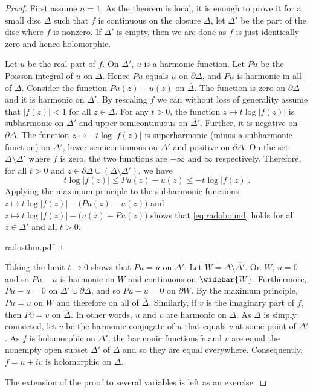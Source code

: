 \documentclass[12pt,openany]{book}
\newcommand{\abs}[1]{\left\lvert {#1} \right\rvert}
\theoremstyle{plain}
\theoremstyle{remark}
\theoremstyle{definition}
\newenvironment{myfig}{%
    \begin{center}
}{%
    \end{center}
}
\theoremstyle{exercise}
\theoremstyle{example}
\begin{document}
\begin{proof}
First assume $n=1$.  As the theorem is local, it is
enough to prove it for a small disc $\Delta$ such that $f$ is continuous
on the closure $\overline{\Delta}$, let $\Delta'$ be the part of the disc
where $f$ is nonzero.  If $\Delta'$ is empty, then we are done as
$f$ is just identically zero and hence holomorphic.

Let $u$ be the real part of $f$.  On $\Delta'$, $u$ is a harmonic function.
Let $Pu$ be the Poisson integral of $u$ on $\Delta$.  Hence $Pu$
equals $u$ on $\partial \Delta$, and $Pu$ is harmonic in all of $\Delta$.
Consider the function
$Pu(z) - u(z)$ on $\overline{\Delta}$.  The function is zero
on $\partial \Delta$ and it is harmonic on $\Delta'$.  By rescaling $f$
we can without loss of generality assume that $\abs{f(z)} < 1$ for all $z
\in \overline{\Delta}$.  For any $t >0$, the function 
$z \mapsto t \log \abs{f(z)}$ is subharmonic on $\Delta'$ and
upper-semicontinuous on $\overline{\Delta'}$.  Further, it is negative
on $\partial \Delta$.  The function $z \mapsto -t \log \abs{f(z)}$ is
superharmonic (minus a subharmonic function) on $\Delta'$,
lower-semicontinuous on $\overline{\Delta'}$ and positive on $\partial
\Delta$.  On the set $\Delta \setminus \Delta'$ where $f$ is zero, the two functions are $-\infty$ and
$\infty$ respectively.  Therefore, for all $t > 0$ and 
$z \in \partial \Delta \cup (\Delta \setminus \Delta')$,
we have
\begin{equation} \label{eq:radobound}
t \log \abs{f(z)} \leq Pu(z)-u(z) \leq -t \log \abs{f(z)}  .
\end{equation}
Applying the maximum principle to the subharmonic functions
$z \mapsto t \log \abs{f(z)} - \bigl(Pu(z)-u(z)\bigr)$
and
$z \mapsto t \log \abs{f(z)} - \bigl(u(z)-Pu(z)\bigr)$
shows that 
\eqref{eq:radobound} holds for all $z \in \Delta'$ and all $t > 0$.

\begin{myfig}
{radosthm.pdf_t}
\end{myfig}


Taking the limit
$t \to 0$ shows that $Pu = u$ on $\Delta'$.
Let $W = \Delta \setminus \overline{\Delta'}$.
On $W$, $u=0$ and so $Pu-u$ is harmonic on $W$
and continuous on $\widebar{W}$.  Furthermore,
$Pu-u=0$ on $\overline{\Delta'} \cup \partial \Delta$,
and so $Pu-u=0$ on $\partial W$.  By the maximum principle, $Pu=u$ on $W$
and therefore on all of $\overline{\Delta}$.
Similarly, if $v$ is the imaginary part of $f$, then $Pv = v$ on
$\overline{\Delta}$.
In other words, $u$ and $v$ are harmonic on $\Delta$.
As $\Delta$ is simply connected,
let $\tilde{v}$ be the harmonic conjugate of $u$ that equals $v$ at
some point of $\Delta'$.  As $f$ is holomorphic on $\Delta'$,
the harmonic functions $\tilde{v}$ and $v$
are equal the nonempty open subset $\Delta'$ of $\Delta$ and so
they are equal everywhere.  Consequently, $f = u +iv$ is holomorphic on
$\Delta$.

The extension of the proof to several variables is left as an exercise.
\end{proof}
\end{document}
